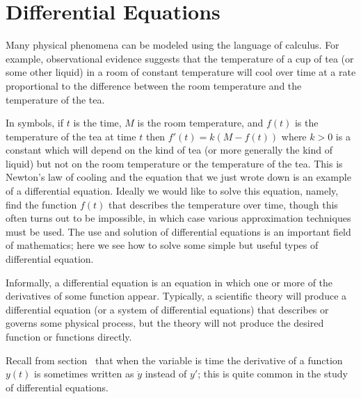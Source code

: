 \chapter{Differential Equations}

Many physical phenomena can be modeled using the
language of calculus. For example, observational evidence suggests
that the temperature of a cup of tea (or some other liquid) in a
room of constant temperature will cool over time at a rate
proportional to the difference between the room temperature  and the
temperature of the tea.

In symbols, if $t$ is the time, $M$ is the room temperature,
and $f(t)$ is the temperature of the tea at time $t$ then $f'(t) =
k(M-f(t))$ where $k>0$ is a constant which will depend on the kind of tea
(or more generally the kind of liquid) but not on the room temperature
or the temperature of the tea. This is {\dfont Newton's law of
  cooling\/} and the equation that we
just wrote down is an example of a {\dfont differential
  equation}.  Ideally we would like to
solve this equation, namely, find the function $f(t)$ that describes
the temperature over time, though this often turns out to be
impossible, in which case various approximation techniques must be
used.  The use and solution of differential equations is an important
field of mathematics; here we see how to solve some simple but useful
types of differential equation.

Informally, a differential equation is an equation in which one or
more of the derivatives of some function appear. Typically, a
scientific theory will produce a differential equation (or a system of
differential equations) that describes or governs some physical
process, but the theory will not produce the desired function or
functions directly. 

Recall from section~ that when the variable
is time the derivative of a function $y(t)$ is sometimes written as 
$\dot y$ instead of $y'$; this is quite common in the study of
differential equations.








%
%

